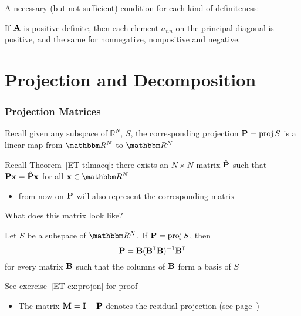 \begin{frame}

     \vspace{2em}
    A necessary (but not sufficient) condition for each kind of definiteness:
    
    \vspace{.7em}
    \Fact{\eqref{ET-fa:ipde0}}
        If $\mathbf A$ is positive definite, then
        each element $a_{nn}$ on the principal diagonal is positive, and the same
        for nonnegative, nonpositive and negative.
        
\end{frame}

\section{Projection and Decomposition}

\begin{frame}\frametitle{Projection Matrices}

     \vspace{2em}
    Recall given any subspace of $\mathbb{R}^{N}$, $S$, the corresponding
    projection $\mathbf P = \operatorname{proj} S$ is a linear map from $\RR^N$ to $\RR^N$

    \vspace{.7em}
    Recall Theorem~\ref{ET-t:lmaeq}: there exists an $N \times N$ matrix $\hat {\mathbf P}$ such that $\mathbf P {\mathbf x} =
    \hat {\mathbf P} {\mathbf x}$ for all $\boldx \in \RR^N$
    \begin{itemize}
        \item from now on $\mathbf P$ will also represent
    the corresponding matrix
    \end{itemize} 
    
    What does this matrix look like?
    
\end{frame}

\begin{frame}

     \vspace{.7em}
    \Thm {\eqref{ET-t:projon}}
    Let $S$ be a subspace of $\RR^N$.  If $\mathbf P = \operatorname{proj} S$, then
    \begin{equation}
        \label{eq:projb}
        \boldP = \boldB (\boldB^\T\boldB)^{-1} \boldB^\T  
    \end{equation}
    for every matrix $\mathbf B$ such that the columns of $\mathbf B$ form a basis
    of $S$ 
    
    \vspace{.7em}
    See exercise~\ref{ET-ex:projon} for proof
    
    \begin{itemize}
        \item  The matrix $\mathbf M = \mathbf I -
                \mathbf P$ denotes the residual projection (see page~\pageref{ET-eq:ann0})
    \end{itemize}
    
\end{frame}

